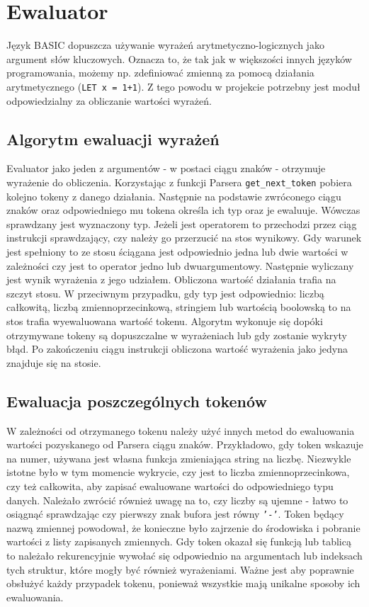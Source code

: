\documentclass[shortabstract]{iithesis}
\begin{document}
\section{Ewaluator}
Język BASIC dopuszcza używanie wyrażeń arytmetyczno-logicznych jako argument słów kluczowych. Oznacza to, że tak jak w większości innych języków programowania, możemy np. zdefiniować zmienną za pomocą działania arytmetycznego (\texttt{LET x = 1+1}). Z tego powodu w projekcie potrzebny jest moduł odpowiedzialny za obliczanie wartości wyrażeń.
\subsection{Algorytm ewaluacji wyrażeń}
Evaluator jako jeden z argumentów - w postaci ciągu znaków - otrzymuje wyrażenie do obliczenia. Korzystając z funkcji Parsera \texttt{get\_next\_token} pobiera kolejno tokeny z danego działania. Następnie na podstawie zwróconego ciągu znaków oraz odpowiedniego mu tokena określa ich typ oraz je ewaluuje. Wówczas sprawdzany jest wyznaczony typ. Jeżeli jest operatorem to przechodzi przez ciąg instrukcji sprawdzający, czy należy go przerzucić na stos wynikowy. Gdy warunek jest spełniony to ze stosu ściągana jest odpowiednio jedna lub dwie wartości w zależności czy jest to operator jedno lub dwuargumentowy. Następnie wyliczany jest wynik wyrażenia z jego udziałem. Obliczona wartość działania trafia na szczyt stosu. W przeciwnym przypadku, gdy typ jest odpowiednio: liczbą całkowitą, liczbą zmiennoprzecinkową, stringiem lub wartością boolowską to na stos trafia wyewaluowana wartość tokenu. Algorytm wykonuje się dopóki otrzymywane tokeny są dopuszczalne w wyrażeniach lub gdy zostanie wykryty błąd. Po zakończeniu ciągu instrukcji obliczona wartość wyrażenia jako jedyna znajduje się na stosie.
\subsection{Ewaluacja poszczególnych tokenów}
W zależności od otrzymanego tokenu należy użyć innych metod do ewaluowania wartości pozyskanego od Parsera ciągu znaków. Przykładowo, gdy token wskazuje na numer, używana jest własna funkcja zmieniająca string na liczbę. Niezwykle istotne było w tym momencie wykrycie, czy jest to liczba zmiennoprzecinkowa, czy też całkowita, aby zapisać ewaluowane wartości do odpowiedniego typu danych. Należało zwrócić również uwagę na to, czy liczby są ujemne - łatwo to osiągnąć sprawdzając czy pierwszy znak bufora jest równy \texttt{'-'}. Token będący nazwą zmiennej powodował, że konieczne było zajrzenie do środowiska i pobranie wartości z listy zapisanych zmiennych. Gdy token okazał się funkcją lub tablicą to należało rekurencyjnie wywołać się odpowiednio na argumentach lub indeksach tych struktur, które mogły być również wyrażeniami. Ważne jest aby poprawnie obsłużyć każdy przypadek tokenu, ponieważ wszystkie mają unikalne sposoby ich ewaluowania.
\end{document}
